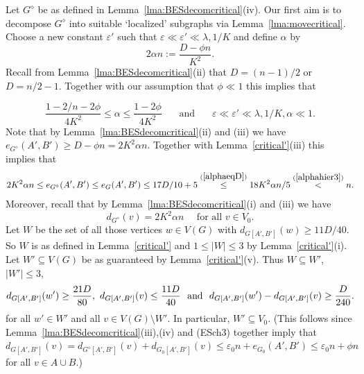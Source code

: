\documentclass{memo-l}
\def\COMMENT#1{}
\def\eps{\varepsilon}
\numberwithin{section}{chapter}
\numberwithin{equation}{section}
\numberwithin{firstthm}{section}
\numberwithin{figure}{section}
\begin{document}
{\removelastskip{}\medskip{}
Let $G^{\diamond}$ be as defined in Lemma~\ref{lma:BESdecomcritical}(iv).
Our first aim is to decompose $G^{\diamond}$ into suitable `localized' subgraphs via Lemma~\ref{lma:movecritical}.
Choose a new constant $\eps'$ such that $\eps \ll \eps' \ll \lambda, 1/K$ and
define $\alpha$ by
\begin{equation} \label{alphaeqD}
2 \alpha n  :=\frac{ D - \phi n}{K^2}.
\end{equation}
Recall from Lemma~\ref{lma:BESdecomcritical}(ii) that $D = (n-1)/2$ or $D = n/2-1$.
Together with our assumption that $\phi \ll 1$ this implies that%
   \COMMENT{$\alpha= \frac{ D/n - \phi}{2K^2}\ge \frac{ 1/2-1/n - \phi}{2K^2}=\frac{ 1-2/n - 2\phi}{4K^2}$.}
\begin{equation}\label{alphahier3}
\frac{ 1-2/n - 2\phi}{4K^2}\le \alpha \le  \frac{ 1 - 2\phi}{4K^2} \ \ \ \  \ \ \ \ \text{and} \ \ \ \  \ \ \ \ \eps \ll \eps'  \ll \lambda, 1/K, \alpha \ll 1.
\end{equation}
Note that by Lemma~\ref{lma:BESdecomcritical}(ii) and (iii) we have $ e_{G^{\diamond}}(A',B') \ge D - \phi n =  2 K^2 \alpha n$.
Together with Lemma~\ref{critical'}(iii) this implies that
\begin{align}
	2 K^2 \alpha n \le  e_{G^{\diamond}}(A',B') \le e_G(A',B') \le 17D/10+5
\stackrel{(\ref{alphaeqD})}{\le} {18 K^2 \alpha n}/{5} \stackrel{(\ref{alphahier3})}{<} n . \label{eW'}
\end{align}
Moreover, recall that by Lemma~\ref{lma:BESdecomcritical}(i) and (iii) we have
\begin{equation}\label{eq:degvV0}
d_{G^{\diamond}}(v) = 2K^2 \alpha n \ \ \ \  \ \ \text{for all } v \in V_0.
\end{equation}
Let $W$ be the set of all those vertices $w\in V(G)$ with $d_{G[A',B']}(w)\ge 11D/40$. So $W$ is as defined in Lemma~\ref{critical'}
and $1\le |W|\le 3$ by Lemma~\ref{critical'}(i). Let $W'\subseteq V(G)$ be as guaranteed by Lemma~\ref{critical'}(v). Thus $W\subseteq W'$, $|W'|\le 3$,
\begin{align}\label{eq:degrees}
d_{G[A',B']}(w')  \ge \frac{21D}{80}, \ 
d_{G[A',B']}(v) \le \frac{11D}{40} \ \
{\rm and} \ \
d_{G[A',B']}(w') - d_{G[A',B']}(v) \ge \frac{D}{240}.
\end{align}
for all $w'\in W'$ and all $v\in V(G)\setminus W'$. In particular, $W'\subseteq V_0$. (This follows since
Lemma~\ref{lma:BESdecomcritical}(iii),(iv) and (ESch3) together imply that
$d_{G[A',B']}(v) = d_{G^\diamond [A',B']}(v)+d_{G_0[A',B']}(v)\le \eps_0 n+e_{G_0}(A',B')\le \eps_0 n+\phi n$ for all $v\in A\cup B$.)
}
\end{document}
